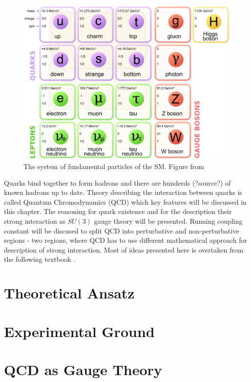 \documentclass[a4paper,11pt]{report}
\begin{document}
\begin{figure}[t]
  \centering
  \includegraphics[width=\textwidth]{Chapter1/SM.png} 
  \caption{The system of fundamental particles of the SM. Figure from
    \cite{wiki:SMParticlesSource}}
  \label{fig:SMparticles}
\end{figure}

Quarks bind together to form hadrons and there are hunderds (?source?) of known
hadrons up to date. Theory describing the interaction between quarks is called
Quantum Chromodynamics (QCD) which key features will be discussed in this
chapter. The reasoning for quark existence and for the description their strong
interaction as $SU(3)$ gauge theory will be presented. Running coupling constant
will be discused to split QCD into perturbative and non-perturbative regions -
two regions, where QCD has to use different mathematical approach for description of
strong interaction. Most of ideas presented here is overtaken from the following
textbook \cite{QCDTextbook}.

\section{Theoretical Ansatz}

\section{Experimental Ground}

\section{QCD as Gauge Theory}
\end{document}
